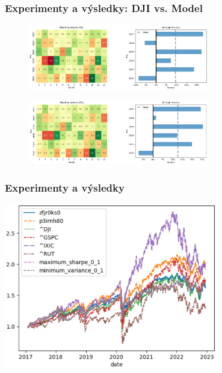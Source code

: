 \begin{frame}
    \frametitle{Experimenty a výsledky: DJI vs. Model}
    \begin{figure}
        \centering
        \includegraphics[width=0.7\textwidth]{img/dji-month-year}
    \end{figure}
    \begin{figure}
        \centering
        \includegraphics[width=0.7\textwidth]{img/model-month-year}
    \end{figure}
\end{frame}

\begin{frame}
    \frametitle{Experimenty a výsledky}
    \begin{center}
        \centering
        \includegraphics[width=0.7\textwidth]{img/returns}
    \end{center}
\end{frame}

